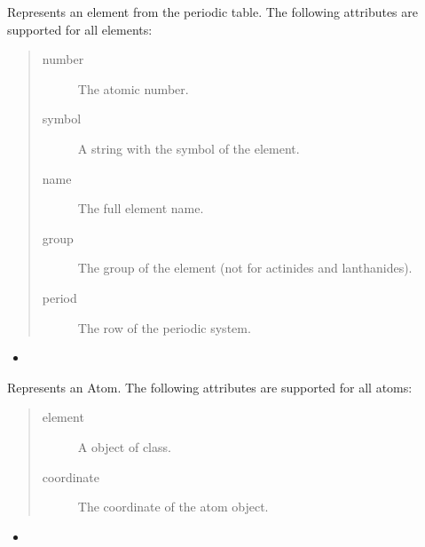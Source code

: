 \documentclass[letterpaper,10pt,english]{sphinxmanual}
\begin{document}
Represents an element from the periodic table. The following attributes are supported for all elements:
\begin{quote}
\begin{description}
\item[{number}] \leavevmode
The atomic number.

\item[{symbol}] \leavevmode
A string with the symbol of the element.

\item[{name}] \leavevmode
The full element name.

\item[{group}] \leavevmode
The group of the element (not for actinides and lanthanides).

\item[{period}] \leavevmode
The row of the periodic system.

\end{description}
\end{quote}
\begin{itemize}
\item {} 

\end{itemize}

Represents an Atom. The following attributes are supported for all atoms:
\begin{quote}
\begin{description}
\item[{element}] \leavevmode
A object of  class.

\item[{coordinate}] \leavevmode
The coordinate of the atom object.

\end{description}
\end{quote}
\begin{itemize}
\item {} 

\end{itemize}
\end{document}
